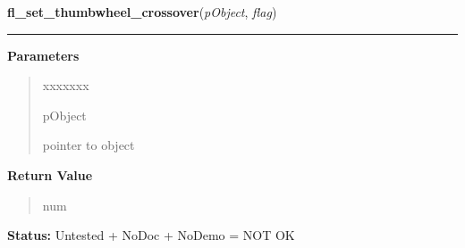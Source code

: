 \hspace{.8\funcindent}\begin{boxedminipage}{\funcwidth}

    \raggedright \textbf{fl\_set\_thumbwheel\_crossover}(\textit{pObject}, \textit{flag})

    \vspace{-1.5ex}

    \rule{\textwidth}{0.5\fboxrule}
\setlength{\parskip}{2ex}
\setlength{\parskip}{1ex}
      \textbf{Parameters}
      \vspace{-1ex}

      \begin{quote}
        \begin{Ventry}{xxxxxxx}

          \item[pObject]

          pointer to object

        \end{Ventry}

      \end{quote}

      \textbf{Return Value}
    \vspace{-1ex}

      \begin{quote}
      num

      \end{quote}

\textbf{Status:} Untested + NoDoc + NoDemo = NOT OK



    \end{boxedminipage}

    \label{xformslib:library:fl_set_thumbwheel_bounds}

    \vspace{0.5ex}


